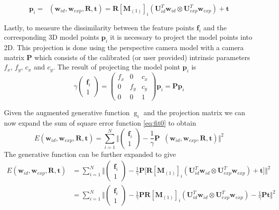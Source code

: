 \documentclass[11pt,a4paper]{report}
\begin{document}
\begin{equation}\label{eq:fit3}
\mathbf{p}_i = \mathop{g_i}(\mathbf{w}_{id},\mathbf{w}_{exp},\mathbf{R},\mathbf{t})
= \mathbf{R}[\mathbf{M}_{(1)}]_{i}(\mathbf{U}_{id}^T\mathbf{w}_{id} \otimes
\mathbf{U}_{exp}^T\mathbf{w}_{exp}) + \mathbf{t}
\end{equation}

Lastly, to measure the dissimilarity between the feature points $\mathbf{f}_i$ and the
corresponding 3D model points $\mathbf{p}_i$ it is necessary to project the model points
into 2D. This projection is done using the perspective camera model with a
camera matrix $\mathbf{P}$ which consists of the calibrated (or
user provided) intrinsic parameters $f_x$, $f_y$, $c_x$ and $c_y$. The result of
projecting the model point $\mathbf{p}_i$ is 
\begin{equation}\label{eq:fit5}
\gamma\begin{pmatrix}\mathbf{f}_i\\1\end{pmatrix}
= \begin{pmatrix}f_x&0&c_x\\0&f_y&c_y\\0&0&1\end{pmatrix}\mathbf{p}_i
    = \mathbf{P}\mathbf{p}_i
\end{equation}

Given the augmented generative function $\mathop{g}_i$ and the projection matrix we can now expand the
sum of square error function \ref{eq:fit0} to obtain
\begin{equation}\label{eq:fit6}
E(\mathbf{w}_{id}, \mathbf{w}_{exp}, \mathbf{R}, \mathbf{t}) = \sum_{i=1}^N \Big\Vert\begin{pmatrix}\mathbf{f}_i\\1\end{pmatrix} - \frac{1}{\gamma}\mathbf{P}\mathop{g_i}(\mathbf{w}_{id},\mathbf{w}_{exp},\mathbf{R},\mathbf{t})\Big\Vert^2
\end{equation}
The generative function can be further expanded to give
\begin{align}\label{eq:fit7}
E(\mathbf{w}_{id}, \mathbf{w}_{exp}, \mathbf{R}, \mathbf{t}) &= \sum_{i=1}^N \Big\Vert\begin{pmatrix}\mathbf{f}_i\\1\end{pmatrix} - \frac{1}{\gamma}\mathbf{P}\bigr[\mathbf{R}[\mathbf{M}_{(1)}]_{i}(\mathbf{U}_{id}^T\mathbf{w}_{id} \otimes
\mathbf{U}_{exp}^T\mathbf{w}_{exp}) + \mathbf{t}\bigl]\Big\Vert^2\\\label{eq:fit8}
&=\sum_{i=1}^N \Big\Vert\begin{pmatrix}\mathbf{f}_i\\1\end{pmatrix} - \frac{1}{\gamma}\mathbf{P}\mathbf{R}[\mathbf{M}_{(1)}]_{i}(\mathbf{U}_{id}^T\mathbf{w}_{id} \otimes
\mathbf{U}_{exp}^T\mathbf{w}_{exp}) - \frac{1}{\gamma}\mathbf{P}\mathbf{t}\Big\Vert^2
\end{align}
\end{document}
